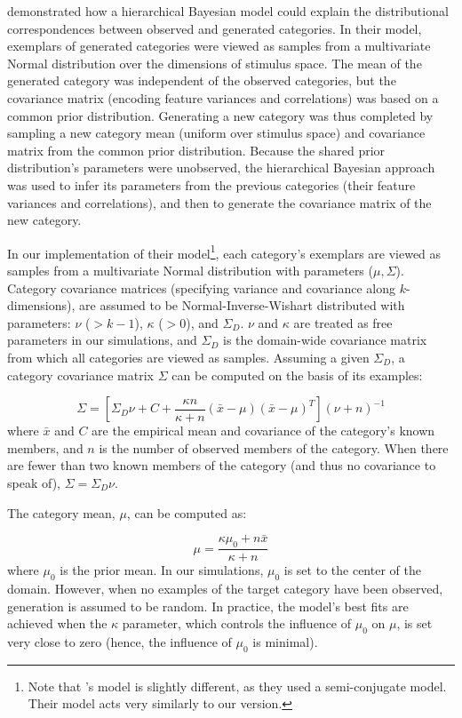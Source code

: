 \documentclass[12pt]{article}
\begin{document}
\cite{jern2013probabilistic} demonstrated how a hierarchical Bayesian model could explain the distributional correspondences between observed and generated categories. In their model, exemplars of generated categories were viewed as samples from a multivariate Normal distribution over the dimensions of stimulus space. The mean of the generated category was independent of the observed categories, but the covariance matrix (encoding feature variances and correlations) was based on a common prior distribution. Generating a new category was thus completed by sampling a new category mean (uniform over stimulus space) and covariance matrix from the common prior distribution. Because the shared prior distribution's parameters were unobserved, the hierarchical Bayesian approach was used to infer its parameters from the previous categories (their feature variances and correlations), and then to generate the covariance matrix of the new category.

In our implementation of their model\footnote{Note that \citet{jern2013probabilistic}'s model is slightly different, as they used a semi-conjugate model. Their model acts very similarly to our version.}, each category's exemplars are viewed as samples from a multivariate Normal distribution with parameters ($\mu, \Sigma$). Category covariance matrices (specifying variance and covariance along $k$-dimensions), are assumed to be Normal-Inverse-Wishart distributed with parameters: $\nu$ ($>k-1$), $\kappa$ ($>0$), and $\Sigma_D$. $\nu$ and $\kappa$ are treated as free parameters in our simulations, and $\Sigma_D$ is the domain-wide covariance matrix from which all categories are viewed as samples. Assuming a given $\Sigma_D$, a category covariance matrix $\Sigma$ can be computed on the basis of its examples:

\begin{equation}
\Sigma = \left[ \Sigma_D \nu + C +
\dfrac
{\kappa n}
{\kappa + n}
(\bar{x}-\mu)(\bar{x}-\mu)^T
\right] (\nu + n)^{-1}
\label{eq:Sigma_B}
\end{equation}
% 
where $\bar{x}$ and $C$ are the empirical mean and covariance of the category's known members, and $n$ is the number of observed members of the category. When there are fewer than two known members of the category (and thus no covariance to speak of), $\Sigma = \Sigma_D\nu$.

The category mean, $\mu$, can be computed as:

\begin{equation}
  \mu = \dfrac
    {\kappa\mu_{0} + n \bar{x}}
    {\kappa + n}
    \label{eq:category_mus}
\end{equation}
% 
where $\mu_{0}$ is the prior mean. In our simulations, $\mu_{0}$ is set to the center of the domain. However, when no examples of the target category have been observed, generation is assumed to be random. In practice, the model's best fits are achieved when the  $\kappa$ parameter, which controls the influence of $\mu_0$ on $\mu$, is set very close to zero (hence, the influence of $\mu_0$ is minimal).
\end{document}
